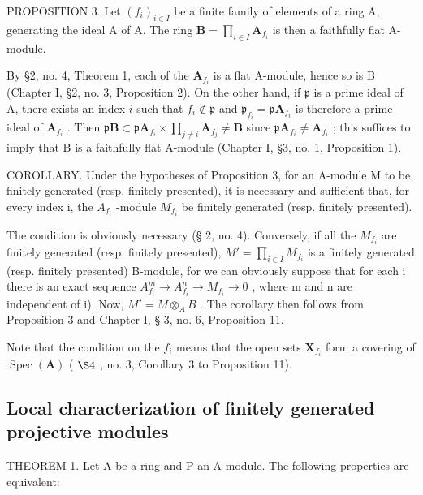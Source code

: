 PROPOSITION 3. Let \((f_{i})_{i\in I}\) be a finite family of elements of a ring A, generating the ideal A of A. The ring \(\mathbf{B} = \prod_{i\in I}\mathbf{A}_{f_i}\) is then a faithfully flat A-module.

By §2, no. 4, Theorem 1, each of the \(\mathbf{A}_{f_i}\) is a flat A-module, hence so is B (Chapter I, §2, no. 3, Proposition 2). On the other hand, if \(\mathfrak{p}\) is a prime ideal of A, there exists an index \(i\) such that \(f_i \notin \mathfrak{p}\) and \(\mathfrak{p}_{f_i} = \mathfrak{p} \mathbf{A}_{f_i}\) is therefore a prime ideal of \(\mathbf{A}_{f_i}\) . Then \(\mathfrak{p} \mathbf{B} \subset \mathfrak{p} \mathbf{A}_{f_i} \times \prod_{j \neq i} \mathbf{A}_{f_j} \neq \mathbf{B}\) since \(\mathfrak{p} \mathbf{A}_{f_i} \neq \mathbf{A}_{f_i}\) ; this suffices to imply that B is a faithfully flat A-module (Chapter I, §3, no. 1, Proposition 1).

COROLLARY. Under the hypotheses of Proposition 3, for an A-module M to be finitely generated (resp. finitely presented), it is necessary and sufficient that, for every index i, the \(A_{f_{i}}\) -module \(M_{f_{i}}\) be finitely generated (resp. finitely presented).

The condition is obviously necessary (§ 2, no. 4). Conversely, if all the \(M_{f_{i}}\) are finitely generated (resp. finitely presented), \(M' = \prod_{i \in I} M_{f_{i}}\) is a finitely generated (resp. finitely presented) B-module, for we can obviously suppose that for each i there is an exact sequence \(A_{f_i}^{m} \to A_{f_i}^{n} \to M_{f_i} \to 0\) , where m and n are independent of i). Now, \(M' = M \otimes_{A} B\) . The corollary then follows from Proposition 3 and Chapter I, § 3, no. 6, Proposition 11.

Note that the condition on the \(f_{i}\) means that the open sets \(\mathbf{X}_{f_{i}}\) form a covering of \(\operatorname{Spec}(\mathbf{A})\) ( \(\S 4\) , no. 3, Corollary 3 to Proposition 11).

\subsection{Local characterization of finitely generated projective modules}

THEOREM 1. Let A be a ring and P an A-module. The following properties are equivalent:

